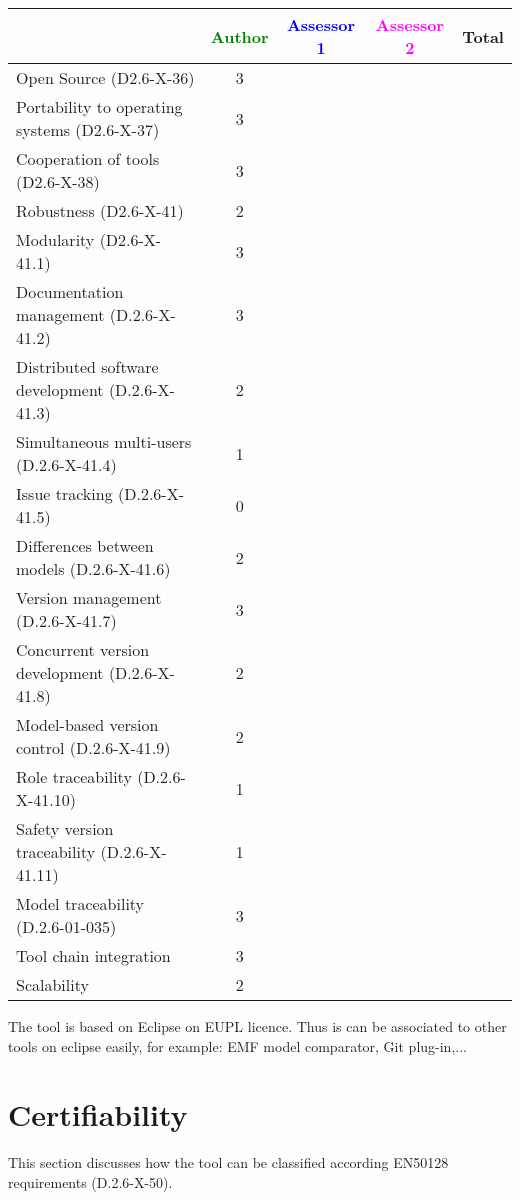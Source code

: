 \begin{tabular}{|l | c | c | c | c|}
\hline
& \textcolor{green}{Author} & \textcolor{blue}{Assessor 1} & \textcolor{magenta}{Assessor 2} & Total \\
\hline 
Open Source (D2.6-X-36) & 3 & & &  \\
\hline 
Portability to operating systems (D2.6-X-37) & 3 & & &  \\
\hline
Cooperation of tools (D2.6-X-38) & 3 & & &  \\
\hline
Robustness (D2.6-X-41) & 2 & & & \\
\hline
Modularity (D2.6-X-41.1) & 3 & & & \\
\hline
Documentation management (D.2.6-X-41.2) & 3 & & & \\
\hline
Distributed software development (D.2.6-X-41.3)  & 2 & & & \\
\hline
Simultaneous multi-users (D.2.6-X-41.4)   & 1 & & & \\
\hline
Issue tracking (D.2.6-X-41.5) & 0 & & & \\
\hline
Differences between models (D.2.6-X-41.6) & 2 & & & \\
\hline
Version management (D.2.6-X-41.7) & 3 & & & \\
\hline
Concurrent version development (D.2.6-X-41.8) & 2 & & & \\
\hline
Model-based version control (D.2.6-X-41.9) & 2 & & & \\
\hline
Role traceability (D.2.6-X-41.10) & 1 & & & \\
\hline
Safety version traceability (D.2.6-X-41.11) & 1 & & & \\
\hline
Model traceability (D.2.6-01-035) & 3 & & & \\
\hline
Tool chain integration & 3 & & & \\
\hline
Scalability & 2 & & & \\
\hline
\end{tabular}

\begin{author_comment}
The tool is based on Eclipse on EUPL licence. Thus is can be associated to  other tools on eclipse easily, for example: EMF model comparator, Git plug-in,...
\end{author_comment}


\section{Certifiability}

This section discusses how the tool can be classified according EN50128 requirements (D.2.6-X-50).


